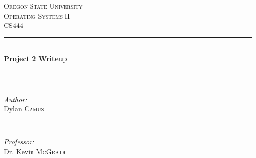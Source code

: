 \documentclass[journal,letterpaper,draftclsnofoot,onecolumn,10pt]{IEEEtran}
\begin{document}
\begin{titlepage}

\newcommand{\HRule}{\rule{\linewidth}{0.5mm}} %

\center %
 

\textsc{\LARGE Oregon State University}\\[1.5cm] %
\textsc{\Large Operating Systems II}\\[0.5cm] %
\textsc{\large CS444}\\[0.5cm] %


\HRule \\[0.4cm]
{ \huge \bfseries Project 2 Writeup}\\[0.4cm] %
\HRule \\[1.5cm]
 

\begin{minipage}{0.4\textwidth}
   \begin{flushleft} \large
      \emph{Author:}\\
      Dylan \textsc{Camus} %
   \end{flushleft}
\end{minipage}
~
\begin{minipage}{0.4\textwidth}
   \begin{flushright} \large
      \emph{Professor:} \\
      Dr. Kevin \textsc{McGrath} %
   \end{flushright}
\end{minipage}\\[4cm]



\end{titlepage}
\end{document}
